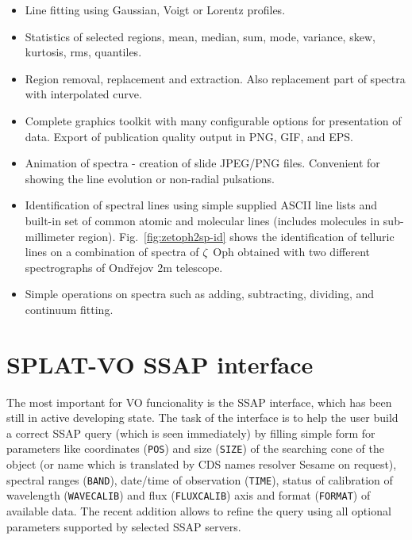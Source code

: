\documentclass[final,authoryear,5p,times,twocolumn]{elsarticle}
\begin{document}
\begin{itemize}
\item Line fitting using Gaussian, Voigt or Lorentz profiles.

\item Statistics of selected regions, mean, median, sum, mode, variance, skew,
      kurtosis, rms, quantiles.

\item Region removal, replacement and extraction. Also replacement part of
spectra  with interpolated curve.

\item Complete graphics toolkit with many configurable options for
  presentation of data. Export of publication quality output in PNG,
  GIF, and EPS.

\item Animation of spectra - creation of slide JPEG/PNG files. Convenient
  for showing the line evolution or non-radial pulsations.

\item Identification of spectral lines using simple supplied ASCII line lists and
 built-in set of common  atomic and molecular lines (includes molecules in sub-millimeter
 region). Fig.~\ref{fig:zetoph2sp-id} shows the identification of telluric lines on a
 combination of spectra of $\zeta$~Oph obtained with two different spectrographs of Ond\v{r}ejov 2m
telescope.

\item Simple operations on spectra such as adding, subtracting,
  dividing, and continuum fitting.

\end{itemize}


\section{SPLAT-VO SSAP interface}

The most important for VO funcionality is the SSAP interface, which
has been still in active developing state.  The task of the interface
is to help the user build a correct SSAP query (which is seen
immediately) by filling simple form for parameters like coordinates
(\texttt{POS}) and size (\texttt{SIZE}) of the searching cone of the
object (or name which is translated by CDS names resolver Sesame on
request), spectral ranges (\texttt{BAND}), date/time of observation
(\texttt{TIME}), status of calibration of wavelength
(\texttt{WAVECALIB}) and flux (\texttt{FLUXCALIB}) axis and format
(\texttt{FORMAT}) of available data.  The recent addition allows to
refine the query using all optional parameters supported by selected
SSAP servers.
\end{document}
